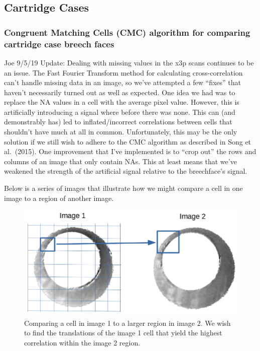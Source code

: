 \documentclass[]{book}
\begin{document}
\hypertarget{cartridge-cases}{%
\subsection{Cartridge Cases}\label{cartridge-cases}}

\hypertarget{congruent-matching-cells-cmc-algorithm-for-comparing-cartridge-case-breech-faces}{%
\subsubsection{Congruent Matching Cells (CMC) algorithm for comparing cartridge case breech faces}\label{congruent-matching-cells-cmc-algorithm-for-comparing-cartridge-case-breech-faces}}

Joe 9/5/19 Update: Dealing with missing values in the x3p scans continues to be an issue. The Fast Fourier Transform method for calculating cross-correlation can't handle missing data in an image, so we've attempted a few ``fixes'' that haven't necessarily turned out as well as expected. One idea we had was to replace the NA values in a cell with the average pixel value. However, this is artificially introducing a signal where before there was none. This can (and demonstrably has) led to inflated/incorrect correlations between cells that shouldn't have much at all in common. Unfortunately, this may be the only solution if we still wish to adhere to the CMC algorithm as described in Song et al.~(2015). One improvement that I've implemented is to ``crop out'' the rows and columns of an image that only contain NAs. This at least means that we've weakened the strength of the artificial signal relative to the breechface's signal.

Below is a series of images that illustrate how we might compare a cell in one image to a region of another image.

\begin{figure}

{\centering \includegraphics[width=0.5\linewidth]{images/joeZ/im1_im2_cellComparison} 

}

\caption{Comparing a cell in image 1 to a larger region in image 2. We wish to find the translations of the image 1 cell that yield the highest correlation within the image 2 region.}\label{fig:unnamed-chunk-8}
\end{figure}
\end{document}
